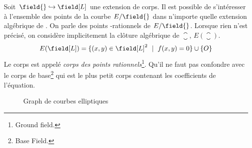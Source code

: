 \begin{definition}
Soit $\field{} \hookrightarrow \field[L]$ une extension de corps. Il est possible de s'intéresser à l'ensemble des points de la courbe $E/\field{}$ dans n'importe quelle extension algébrique de \field{}. On parle des points \field[L]-rationnels de $E/\field{}$. Lorsque rien n'est précisé, on considère implicitement la clôture algébrique de $\closure{}$, $E(\closure{})$.
\begin{equation}
    E(\field[L]) = \{(x,y) \in \field[L]^2\ \mid\ f(x,y) = 0\} \cup \{O\}
\end{equation}
Le corps \field[L] est appelé \emph{corps des points rationnels}\footnote{Ground field.}. Qu'il ne faut pas confondre avec le corps de base\footnote{Base Field.} \field{} qui est le plus petit corps contenant les coefficients de l'équation.
\end{definition}

\begin{figure}[ht]
\centering
    \label{fig:EC}
    \caption{Graph de courbes elliptiques}
\end{figure}

